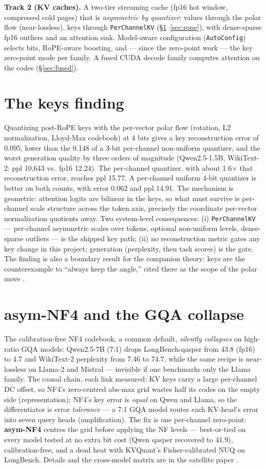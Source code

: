 \documentclass[11pt]{article}
\begin{document}
\textbf{Track 2 (KV caches).} A two-tier streaming cache (fp16 hot window,
compressed cold pages) that is \emph{asymmetric by quantizer}: values through
the polar flow (near-lossless), keys through \texttt{PerChannelKV}
(\S\ref{sec:keys}--\ref{sec:rope}), with dense-sparse fp16 outliers and an
attention sink. Model-aware configuration (\texttt{AutoConfig}) selects bits,
RoPE-aware boosting, and --- since the zero-point work --- the key zero-point
mode per family. A fused CUDA decode family computes attention on the codes
(\S\ref{sec:fused}).

\section{The keys finding}\label{sec:keys}
Quantizing post-RoPE keys with the per-vector polar flow (rotation, L2
normalization, Lloyd-Max codebook) at 4 bits gives a key reconstruction error
of 0.095, lower than the 0.148 of a 3-bit per-channel non-uniform quantizer,
and the worst generation quality by three orders of magnitude (Qwen2.5-1.5B,
WikiText-2: ppl 10{,}643 vs.\ fp16 12.24). The per-channel quantizer, with
about 1.6$\times$ that reconstruction error, reaches ppl 15.77. A per-channel
uniform 4-bit quantizer is better on both counts, with error 0.062 and
ppl 14.91. The mechanism is geometric: attention logits are bilinear in the
keys, so what must survive is per-channel scale structure across the token
axis, precisely the coordinate per-vector normalization quotients away. Two
system-level consequences: (i) \texttt{PerChannelKV} --- per-channel
asymmetric scales over tokens, optional non-uniform levels, dense-sparse
outliers --- is the shipped key path; (ii) no reconstruction metric gates any
key change in this project; generation (perplexity, then task scores) is the
gate. The finding is also a boundary result for the companion theory: keys
are the counterexample to ``always keep the angle,'' cited there as the
scope of the polar move \cite{kta}.

\section{asym-NF4 and the GQA collapse}\label{sec:nf4}
The calibration-free NF4 codebook, a common default, \emph{silently
collapses} on high-ratio GQA models: Qwen2.5-7B (7:1) drops
LongBench-qasper from 43.8 (fp16) to 4.7 and WikiText-2 perplexity from 7.46
to 74.7, while the same recipe is near-lossless on Llama-2 and Mistral ---
invisible if one benchmarks only the Llama family. The causal chain, each
link measured: KV keys carry a large per-channel DC offset, so NF4's
zero-centred abs-max grid wastes half its codes on the empty side
(representation); NF4's key error is \emph{equal} on Qwen and Llama, so the
differentiator is error \emph{tolerance} --- a 7:1 GQA model routes each
KV-head's error into seven query heads (amplification). The fix is one
per-channel zero-point: \textbf{asym-NF4} centres the grid before applying
the NF levels --- best-or-tied on every model tested at no extra bit cost
(Qwen qasper recovered to 41.9), calibration-free, and a dead heat with
KVQuant's Fisher-calibrated NUQ on LongBench. Details and the cross-model
matrix are in the satellite paper \cite{kvtmlr}.
\end{document}
